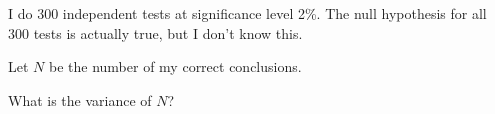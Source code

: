 
\begin{question}
I do \(300\) independent tests at significance level 2\%.
The null hypothesis for all \(300\)
tests is actually true, but I don't know this.

Let \(N\) be the number of my correct conclusions.

What is the variance of \(N\)?
\end{question}


